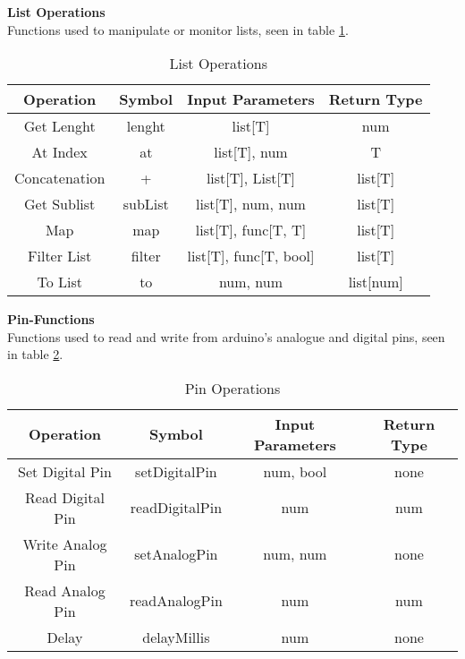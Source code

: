 \textbf{List Operations}\\
Functions used to manipulate or monitor lists, seen in table \ref{tbl:list}.
\begin{table}[h]
	\centering
	\caption{List Operations}
	\label{tbl:list}
	\begin{tabular}{|c|c|c|c|}
		\hline
		\textbf{Operation}     & \textbf{Symbol}  & \textbf{Input Parameters}            & \textbf{Return Type} \\ \hline
		Get Lenght    & lenght  & list{[}T{]}                 & num         \\ \hline
		At Index      & at      & list{[}T{]}, num            & T           \\ \hline
		Concatenation & +       & list{[}T{]}, List{[}T{]}    & list{[}T{]} \\ \hline
		Get Sublist   & subList & list{[}T{]}, num, num       & list{[}T{]} \\ \hline
		Map           & map     & list{[}T{]}, func[T, T]     & list{[}T{]} \\ \hline
		Filter List   & filter  & list{[}T{]}, func[T, bool]  & list{[}T{]} \\ \hline
		To List       & to      & num, num                    & list[num]   \\ \hline
	\end{tabular}
\end{table}
\newpage

\textbf{Pin-Functions}\\
Functions used to read and write from arduino's analogue and digital pins, seen in table \ref{tbl:pins}.
\begin{table}[h]
	\centering
	\caption{Pin Operations}
	\label{tbl:pins}
	\begin{tabular}{|c|c|c|c|}
		\hline
		\textbf{Operation}                                                      & \textbf{Symbol}         & \textbf{Input Parameters} & \textbf{Return Type} \\ \hline
		Set Digital Pin                                                & setDigitalPin  & num, bool        & none        \\ \hline
		Read Digital Pin                                               & readDigitalPin & num              & num         \\ \hline
		Write Analog Pin                                               & setAnalogPin   & num, num         & none        \\ \hline
		Read Analog Pin                                                & readAnalogPin  & num              & num         \\ \hline
		Delay                                                          & delayMillis    & num              & none        \\ \hline
	\end{tabular}
\end{table}


